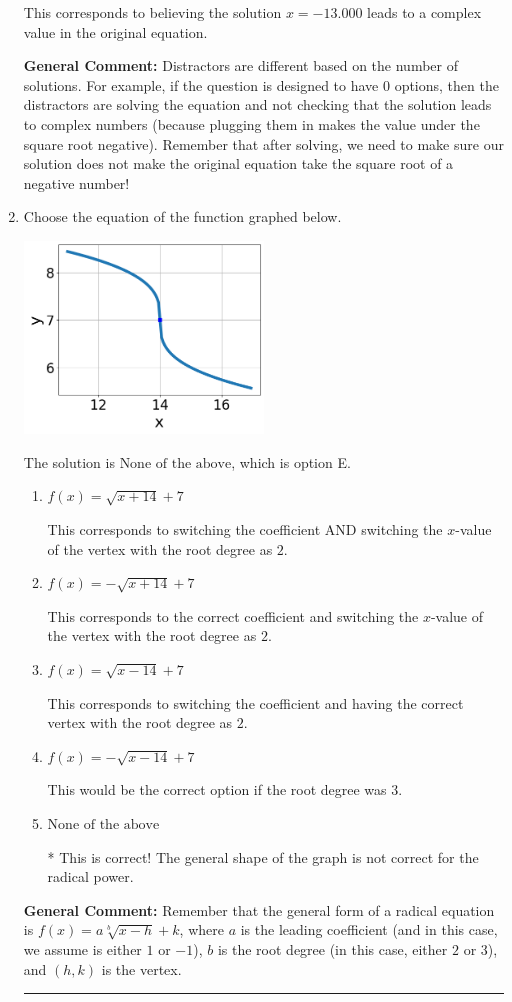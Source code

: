 \documentclass{extbook}[14pt]
\newcommand{\litem}[1]{\item #1

\rule{\textwidth}{0.4pt}}
\begin{document}
\begin{enumerate}
{\begin{enumerate}[label=\Alph*.]
This corresponds to believing the solution $x = -13.000$ leads to a complex value in the original equation.
\end{enumerate}

\textbf{General Comment:} Distractors are different based on the number of solutions. For example, if the question is designed to have 0 options, then the distractors are solving the equation and not checking that the solution leads to complex numbers (because plugging them in makes the value under the square root negative). Remember that after solving, we need to make sure our solution does not make the original equation take the square root of a negative number!
}
\litem{
Choose the equation of the function graphed below.

\begin{center}
    \includegraphics[width=0.5\textwidth]{../Figures/radicalGraphToEquationCopyC.png}
\end{center}


The solution is \( \text{None of the above} \), which is option E.\begin{enumerate}[label=\Alph*.]
\item \( f(x) = \sqrt{x + 14} + 7 \)

This corresponds to switching the coefficient AND switching the $x$-value of the vertex with the root degree as $2$.
\item \( f(x) = - \sqrt{x + 14} + 7 \)

This corresponds to the correct coefficient and switching the $x$-value of the vertex with the root degree as $2$.
\item \( f(x) = \sqrt{x - 14} + 7 \)

This corresponds to switching the coefficient and having the correct vertex with the root degree as $2$.
\item \( f(x) = - \sqrt{x - 14} + 7 \)

This would be the correct option if the root degree was $3$.
\item \( \text{None of the above} \)

* This is correct! The general shape of the graph is not correct for the radical power.
\end{enumerate}

\textbf{General Comment:} Remember that the general form of a radical equation is $ f(x) = a \sqrt[b]{x - h} + k$, where $a$ is the leading coefficient (and in this case, we assume is either $1$ or $-1$), $b$ is the root degree (in this case, either $2$ or $3$), and $(h, k)$ is the vertex.
}
\end{enumerate}
\end{document}
